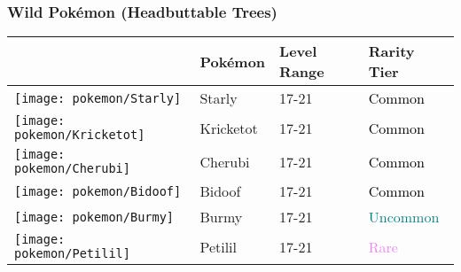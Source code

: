 \subsubsection{Wild Pokémon (Headbuttable Trees)}%
\label{ssubsec:WildPokmon(HeadbuttableTrees)}%
\begin{longtable}{||l l l l||}%
\hline%
&Pokémon&Level Range&Rarity Tier\\%
\hline%
\endhead%
\hline%
\texttt{[image: pokemon/Starly]}&Starly&17{-}21&\textcolor{black}{%
Common%
}\\%
\hline%
\texttt{[image: pokemon/Kricketot]}&Kricketot&17{-}21&\textcolor{black}{%
Common%
}\\%
\hline%
\texttt{[image: pokemon/Cherubi]}&Cherubi&17{-}21&\textcolor{black}{%
Common%
}\\%
\hline%
\texttt{[image: pokemon/Bidoof]}&Bidoof&17{-}21&\textcolor{black}{%
Common%
}\\%
\hline%
\texttt{[image: pokemon/Burmy]}&Burmy&17{-}21&\textcolor{teal}{%
Uncommon%
}\\%
\hline%
\texttt{[image: pokemon/Petilil]}&Petilil&17{-}21&\textcolor{violet}{%
Rare%
}\\%
\hline%
\end{longtable}%
\caption{Wild Pokemon in Route 209 (Headbuttable Trees)}